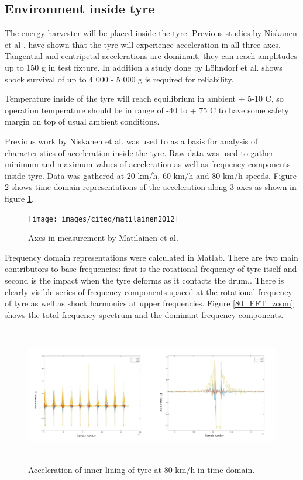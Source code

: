 \subsection{Environment inside tyre}
The energy harvester will be placed inside the tyre. Previous studies by Niskanen et al \cite{Niskanen2014}. have shown that the tyre will experience acceleration in all three axes. Tangential and centripetal accelerations are dominant, they can reach amplitudes up to 150 g in test fixture. In addition a study done by Löhndorf et al. \cite{Lohndorf2007} shows shock survival of up to 4 000 - 5 000 g is required for reliability. 

Temperature inside of the tyre will reach equilibrium in ambient + 5-10 \degree C, so operation temperature should be in range of -40 to + 75 \degree C to have some safety margin on top of usual ambient conditions. 

Previous work by Niskanen et al. \cite{Niskanen2014} was used to as a basis for analysis of characteristics of acceleration inside the tyre. Raw data was used to gather minimum and maximum values of acceleration as well as frequency components inside tyre. Data was gathered at 20 km/h, 60 km/h and 80 km/h speeds. Figure \ref{80_TD} shows time domain representations of the acceleration along 3 axes as shown in figure \ref{tyre_axes}.

\begin{figure}[htb]
\begin{center}
\texttt{[image: images/cited/matilainen2012]}
\end{center}
\caption{Axes in measurement by Matilainen et al. \cite{Matilainen2012}}
\label{tyre_axes}
\end{figure}

Frequency domain representations were calculated in Matlab. There are two main contributors to base frequencies: first is the rotational frequency of tyre itself and second is the impact when the tyre deforms as it contacts the drum.. There is clearly visible series of frequency components spaced at the rotational frequency of tyre as well as shock harmonics at upper frequencies. Figure \ref{80_FFT_zoom} shows the total frequency spectrum and the dominant frequency components.

\begin{figure}[htb]
\begin{center}
\includegraphics[height=6cm]{images/matlab_figures/80kmh_timedomain_combined}
\end{center}
\caption{Acceleration of inner lining of tyre at 80 km/h in time domain.}
\label{80_TD}
\end{figure}

